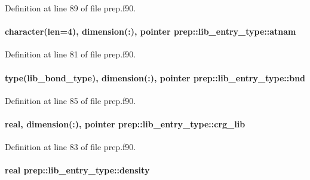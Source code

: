 Definition at line 89 of file prep.\-f90.

\hypertarget{structprep_1_1lib__entry__type_a2d174c880961fd024aefdc62d1a1762c}{
\paragraph[{atnam}]{\setlength{\rightskip}{0pt plus 5cm}character(len=4), dimension(\-:), pointer prep\-::lib\-\_\-entry\-\_\-type\-::atnam}}\label{structprep_1_1lib__entry__type_a2d174c880961fd024aefdc62d1a1762c}


Definition at line 81 of file prep.\-f90.

\hypertarget{structprep_1_1lib__entry__type_a9362862a57577cab41a136de040ef535}{
\paragraph[{bnd}]{\setlength{\rightskip}{0pt plus 5cm}type({\bf lib\-\_\-bond\-\_\-type}), dimension(\-:), pointer prep\-::lib\-\_\-entry\-\_\-type\-::bnd}}\label{structprep_1_1lib__entry__type_a9362862a57577cab41a136de040ef535}


Definition at line 85 of file prep.\-f90.

\hypertarget{structprep_1_1lib__entry__type_aff5cea6fcc91e693f42c94fed7035cc8}{
\paragraph[{crg\-\_\-lib}]{\setlength{\rightskip}{0pt plus 5cm}real, dimension(\-:), pointer prep\-::lib\-\_\-entry\-\_\-type\-::crg\-\_\-lib}}\label{structprep_1_1lib__entry__type_aff5cea6fcc91e693f42c94fed7035cc8}


Definition at line 83 of file prep.\-f90.

\hypertarget{structprep_1_1lib__entry__type_aedd5873eb866bd88b8c173316dd3f7d9}{
\paragraph[{density}]{\setlength{\rightskip}{0pt plus 5cm}real prep\-::lib\-\_\-entry\-\_\-type\-::density}}\label{structprep_1_1lib__entry__type_aedd5873eb866bd88b8c173316dd3f7d9}



